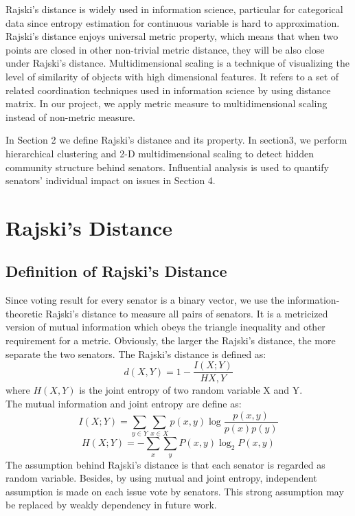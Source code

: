 \documentclass{article} %
\begin{document}
Rajski's distance is widely used in information science, particular for categorical data since entropy estimation for continuous variable is hard to approximation. Rajski's distance enjoys universal metric property, which means that when two points are closed in other non-trivial metric distance, they will be also close under Rajski's distance.
Multidimensional scaling is a technique of visualizing the level of similarity of objects with high dimensional features. It refers to a set of related coordination techniques used in information science by using distance matrix. In our project, we apply metric measure to multidimensional scaling instead of non-metric measure.

In Section 2 we define Rajski's distance and its property. In section3, we perform hierarchical clustering and 2-D multidimensional scaling to detect hidden community structure behind senators. Influential analysis is used to quantify senators' individual impact on issues in Section 4.

\section{Rajski's Distance}
\subsection{Definition of Rajski's Distance}
Since voting result for every senator is a binary vector, we use the information-theoretic Rajski's distance to measure all pairs of senators. It is a metricized version of mutual information which obeys the triangle inequality and other requirement for a metric. Obviously, the larger the Rajski's distance, the more separate the two senators. The Rajski's distance is defined as:
$$d(X,Y)=1-\frac{I(X;Y)}{H{X,Y}}$$
where $H(X,Y)$ is the joint entropy of two random variable X and Y. \\
The mutual information and joint entropy are define as:
$$I(X;Y)=\sum_{y\in Y}\sum_{x\in X}p(x,y)\log\frac{p(x,y)}{p(x)p(y)}$$
$$H(X;Y)=-\sum_{x}\sum_{y}P(x,y)\log_2P(x,y)$$
The assumption behind Rajski's distance is that each senator is regarded as random variable. Besides, by using mutual and joint entropy, independent assumption is made on each issue vote by senators. This strong assumption may be replaced by weakly dependency in future work.
\end{document}
